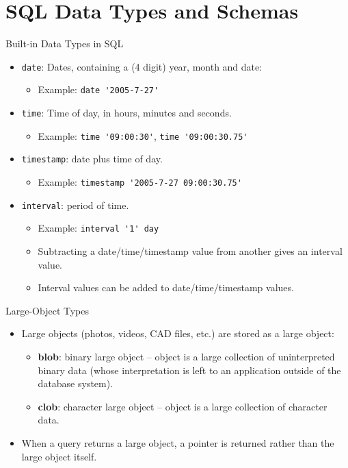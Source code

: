 \documentclass{beamer}
\begin{document}
\section{SQL Data Types and Schemas}

\begin{frame}[fragile]{Built-in Data Types in SQL}
    \begin{itemize}
        \item \texttt{date}: Dates, containing a (4 digit) year, month and date:
        \begin{itemize}
            \item Example: \verb|date '2005-7-27'|
        \end{itemize}
        \item \texttt{time}: Time of day, in hours, minutes and seconds.
        \begin{itemize}
            \item Example: \verb|time '09:00:30'|,  \verb|time '09:00:30.75'|
        \end{itemize}
        \item \texttt{timestamp}: date plus time of day.
        \begin{itemize}
            \item Example: \verb|timestamp '2005-7-27 09:00:30.75'|
        \end{itemize}
        \item \texttt{interval}: period of time.
        \begin{itemize}
            \item Example: \verb|interval '1' day|
            \item Subtracting a date/time/timestamp value from another gives an interval value.
            \item Interval values can be added to date/time/timestamp values.
        \end{itemize}
    \end{itemize}
\end{frame}

\begin{frame}{Large-Object Types}
    \begin{itemize}
        \item Large objects (photos, videos, CAD files, etc.) are stored as a large object:
        \begin{itemize}
            \item \textbf{blob}: binary large object -- object is a large collection of uninterpreted binary data (whose interpretation is left to an application outside of the database system).
            \item \textbf{clob}: character large object -- object is a large collection of character data.
        \end{itemize}
        \item When a query returns a large object, a pointer is returned rather than the large object itself.
    \end{itemize}
\end{frame}
\end{document}
